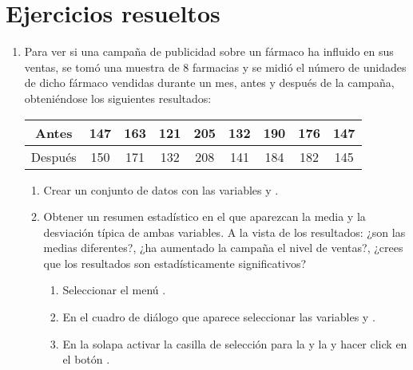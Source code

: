 \section{Ejercicios resueltos}
\begin{enumerate}[leftmargin=*] 
\item  Para ver si una campaña de publicidad sobre un fármaco ha influido en sus ventas, se tomó una muestra de 8 farmacias y se midió el
número de unidades de dicho fármaco vendidas durante un mes, antes y después de la campaña, obteniéndose los siguientes resultados: 
\begin{center}
\begin{tabular}{|c||c|c|c|c|c|c|c|c|}
\hline 
Antes & 147 & 163 & 121 & 205 & 132 & 190 & 176 & 147 \\
\hline 
Después & 150 & 171 & 132 & 208 & 141 & 184 & 182 & 145\\ 
\hline
\end{tabular}
\end{center}

\begin{enumerate}
\item Crear un conjunto de datos con las variables  y .

\item Obtener un resumen estadístico en el que aparezcan la media y la desviación típica de ambas variables. A la vista
de los resultados: ¿son las medias diferentes?, ¿ha aumentado la campaña el nivel de ventas?, ¿crees que los resultados
son estadísticamente significativos? 
\begin{indicacion}{
\begin{enumerate}
\item Seleccionar el menú .
\item En el cuadro de diálogo que aparece seleccionar las variables  y .
\item En la solapa  activar la casilla de selección
para la  y la  y hacer click en el botón .
\end{enumerate}
}
\end{indicacion}


\end{enumerate}
\end{enumerate}

